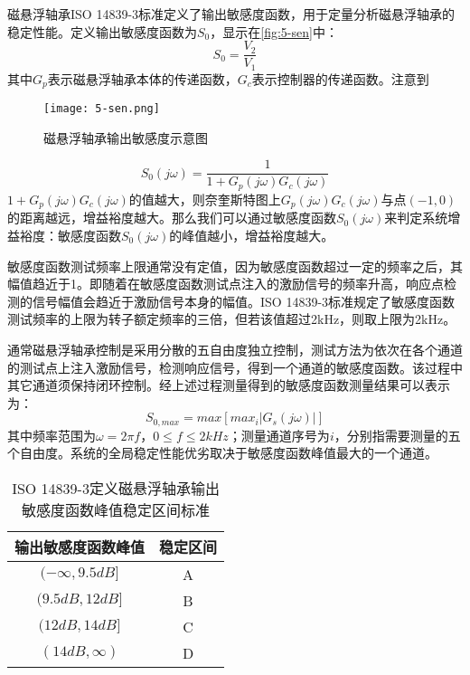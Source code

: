 \documentclass[
  lang=cn,
  degree=master,
  openany,oneside
]{nuaathesis}
\begin{document}
磁悬浮轴承ISO 14839-3标准\cite{iso2004mechanical}定义了输出敏感度函数，用于定量分析磁悬浮轴承的稳定性能。定义输出敏感度函数为$S_0$，显示在\autoref{fig:5-sen}中：
\begin{equation}
	S_0 = \frac{V_2}{V_1}
\end{equation}
其中$G_p$表示磁悬浮轴承本体的传递函数，$G_c$表示控制器的传递函数。注意到
\begin{figure}[h!]
	\texttt{[image: 5-sen.png]}
	\caption{磁悬浮轴承输出敏感度示意图}
	\label{fig:5-sen}
\end{figure}

\begin{equation}
	S_0(j\omega) = \frac{1}{1 + G_p(j\omega)G_c(j\omega)}
\end{equation}
$1 + G_p(j\omega)G_c(j\omega)$的值越大，则奈奎斯特图上$G_p(j\omega)G_c(j\omega)$与点$(-1,0)$的距离越远，增益裕度越大。那么我们可以通过敏感度函数$S_0(j\omega)$来判定系统增益裕度：敏感度函数$S_0(j\omega)$的峰值越小，增益裕度越大。

敏感度函数测试频率上限通常没有定值，因为敏感度函数超过一定的频率之后，其幅值趋近于1。即随着在敏感度函数测试点注入的激励信号的频率升高，响应点检测的信号幅值会趋近于激励信号本身的幅值。ISO 14839-3标准规定了敏感度函数测试频率的上限为转子额定频率的三倍，但若该值超过2kHz，则取上限为2kHz。

通常磁悬浮轴承控制是采用分散的五自由度独立控制，测试方法为依次在各个通道的测试点上注入激励信号，检测响应信号，得到一个通道的敏感度函数。该过程中其它通道须保持闭环控制。经上述过程测量得到的敏感度函数测量结果可以表示为：
\begin{equation}
	S_{0,max} = max \left[ max_i \left|G_s(j\omega)\right| \right]
\end{equation}
其中频率范围为$\omega = 2 \pi f$，$0 \leq f \leq 2kHz$；测量通道序号为$i$，分别指需要测量的五个自由度。系统的全局稳定性能优劣取决于敏感度函数峰值最大的一个通道。

\begin{table}[h!]
  \caption[ISO 14839-3定义磁悬浮轴承输出敏感度函数峰值稳定区间标准]{ISO 14839-3定义磁悬浮轴承输出敏感度函数峰值稳定区间标准\label{tab:amb_iso}}
  \begin{tabular}{cc}
    \toprule
    输出敏感度函数峰值 & 稳定区间 \\
    \midrule
    $(-\infty,9.5dB]$ & A\\
    $(9.5dB,12dB]$    & B\\
    $(12dB,14dB]$     & C\\
    $(14dB,\infty)$   & D\\
    \bottomrule
  \end{tabular}
\end{table}
\end{document}
